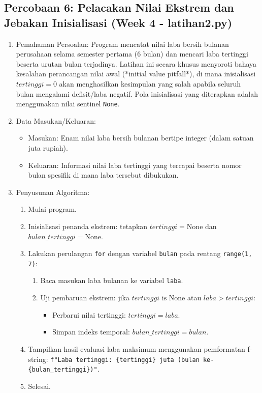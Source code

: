 \documentclass[12pt,a4paper]{article}
\begin{document}
\subsection{Percobaan 6: Pelacakan Nilai Ekstrem dan Jebakan Inisialisasi (Week 4 - latihan2.py)}
\begin{enumerate}
    \item Pemahaman Persoalan: Program mencatat nilai laba bersih bulanan perusahaan selama semester pertama (6 bulan) dan mencari laba tertinggi beserta urutan bulan terjadinya. Latihan ini secara khusus menyoroti bahaya kesalahan perancangan nilai awal (*initial value pitfall*), di mana inisialisasi $tertinggi = 0$ akan menghasilkan kesimpulan yang salah apabila seluruh bulan mengalami defisit/laba negatif. Pola inisialisasi yang diterapkan adalah menggunakan nilai sentinel \texttt{None}.
    \item Data Masukan/Keluaran:
    \begin{itemize}
        \item Masukan: Enam nilai laba bersih bulanan bertipe integer (dalam satuan juta rupiah).
        \item Keluaran: Informasi nilai laba tertinggi yang tercapai beserta nomor bulan spesifik di mana laba tersebut dibukukan.
    \end{itemize}
    \item Penyusunan Algoritma:
    \begin{enumerate}[label=\alph*.]
        \item Mulai program.
        \item Inisialisasi penanda ekstrem: tetapkan $tertinggi = \text{None}$ dan $bulan\_tertinggi = \text{None}$.
        \item Lakukan perulangan \texttt{for} dengan variabel \texttt{bulan} pada rentang \texttt{range(1, 7)}:
        \begin{enumerate}[label=\roman*.]
            \item Baca masukan laba bulanan ke variabel \texttt{laba}.
            \item Uji pembaruan ekstrem: jika $tertinggi \text{ is None}$ atau $laba > tertinggi$:
            \begin{itemize}
                \item Perbarui nilai tertinggi: $tertinggi = laba$.
                \item Simpan indeks temporal: $bulan\_tertinggi = bulan$.
            \end{itemize}
        \end{enumerate}
        \item Tampilkan hasil evaluasi laba maksimum menggunakan pemformatan f-string: \texttt{f"Laba tertinggi: \{tertinggi\} juta (bulan ke-\{bulan\_tertinggi\})"}.
        \item Selesai.
    \end{enumerate}
\end{enumerate}
\end{document}

